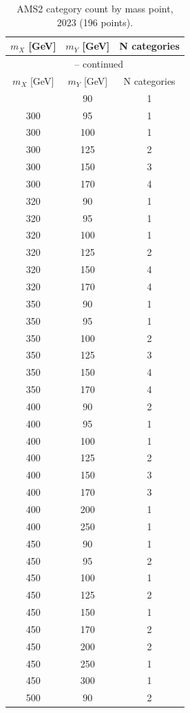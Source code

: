\begin{longtable}{c c c}
\caption{AMS2 category count by mass point, 2023 (196 points).}
\label{tab:category_count_2023} \\
\hline
$m_X$ [GeV] & $m_Y$ [GeV] & N categories \\
\hline
\endfirsthead
\multicolumn{3}{c}{\tablename\ \thetable{} -- continued} \\
\hline
$m_X$ [GeV] & $m_Y$ [GeV] & N categories \\
\hline
\endhead
\hline
\endfoot
\hline
\endlastfoot
300 & 90 & 1 \\
300 & 95 & 1 \\
300 & 100 & 1 \\
300 & 125 & 2 \\
300 & 150 & 3 \\
300 & 170 & 4 \\
320 & 90 & 1 \\
320 & 95 & 1 \\
320 & 100 & 1 \\
320 & 125 & 2 \\
320 & 150 & 4 \\
320 & 170 & 4 \\
350 & 90 & 1 \\
350 & 95 & 1 \\
350 & 100 & 2 \\
350 & 125 & 3 \\
350 & 150 & 4 \\
350 & 170 & 4 \\
400 & 90 & 2 \\
400 & 95 & 1 \\
400 & 100 & 1 \\
400 & 125 & 2 \\
400 & 150 & 3 \\
400 & 170 & 3 \\
400 & 200 & 1 \\
400 & 250 & 1 \\
450 & 90 & 1 \\
450 & 95 & 2 \\
450 & 100 & 1 \\
450 & 125 & 2 \\
450 & 150 & 1 \\
450 & 170 & 2 \\
450 & 200 & 2 \\
450 & 250 & 1 \\
450 & 300 & 1 \\
500 & 90 & 2 \\

\end{longtable}
